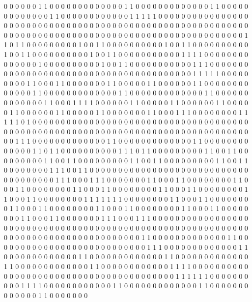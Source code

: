 0 0 0 0 0 0 1 1 0 0 0 0 0 0 0
0 0 0 0 0 0 1 1 0 0 0 0 0 0 0
0 0 0 0 0 0 1 1 0 0 0 0 0 0 0
0 0 0 0 0 0 1 1 0 0 0 0 0 0 0
0 0 0 0 0 1 1 1 1 1 0 0 0 0 0
0 0 0 0 0 0 0 0 0 0 0 0 0 0 0
0 0 0 0 0 0 0 0 0 0 0 0 0 0 0
0 0 0 0 0 0 0 0 0 0 0 0 0 0 0
0 0 0 0 0 0 0 0 0 0 0 0 0 0 0
0 0 0 0 0 0 0 0 0 0 0 0 0 0 0
0 0 0 0 0 0 0 0 0 0 0 0 0 0 0
0 0 0 0 0 0 1 1 0 1 1 0 0 0 0
0 0 0 0 0 1 0 0 1 1 0 0 0 0 0
0 0 0 0 0 1 0 0 1 1 0 0 0 0 0
0 0 0 0 0 1 0 0 1 1 0 0 0 0 0
0 0 0 0 0 1 0 0 1 1 0 0 0 0 0
0 0 0 0 0 0 1 1 1 1 0 0 0 0 0
0 0 0 0 0 0 0 0 0 1 0 0 0 0 0
0 0 0 0 0 1 0 0 1 1 0 0 0 0 0
0 0 0 0 0 0 1 1 1 0 0 0 0 0 0
0 0 0 0 0 0 0 0 0 0 0 0 0 0 0
0 0 0 0 0 0 0 0 0 0 0 0 0 0 0
0 0 0 0 1 1 1 1 1 0 0 0 0 0 0
0 0 0 1 1 0 0 0 1 1 0 0 0 0 0
0 0 1 1 0 0 0 0 0 1 1 0 0 0 0
0 0 1 1 0 0 0 0 0 0 0 0 0 0 0
0 0 1 1 0 0 0 0 0 0 0 0 0 0 0
0 0 1 1 0 0 0 0 0 0 0 0 0 0 0
0 0 1 1 0 0 0 0 0 0 0 0 0 0 0
0 0 1 1 0 0 0 1 1 1 1 0 0 0 0
0 0 1 1 0 0 0 0 0 1 1 0 0 0 0
0 0 1 1 0 0 0 0 0 1 1 0 0 0 0
0 0 1 1 0 0 0 0 0 1 1 0 0 0 0
0 0 0 1 1 0 0 0 1 1 1 0 0 0 0
0 0 0 0 1 1 1 1 1 0 1 0 0 0 0
0 0 0 0 0 0 0 0 0 0 0 0 0 0 0
0 0 0 0 0 0 0 0 0 0 0 0 0 0 0
0 0 0 0 0 0 0 0 0 0 0 0 0 0 0
0 0 0 0 0 0 0 0 0 0 0 0 0 0 0
0 0 0 0 0 0 0 0 0 0 0 0 0 0 0
0 0 0 0 1 1 1 0 0 0 0 0 0 0 0
0 0 0 0 0 1 1 0 0 0 0 0 0 0 0
0 0 0 0 0 1 1 0 0 0 0 0 0 0 0
0 0 0 0 0 1 1 0 1 1 0 0 0 0 0
0 0 0 0 0 1 1 1 0 1 1 0 0 0 0
0 0 0 0 0 1 1 0 0 1 1 0 0 0 0
0 0 0 0 0 1 1 0 0 1 1 0 0 0 0
0 0 0 0 0 1 1 0 0 1 1 0 0 0 0
0 0 0 0 0 1 1 0 0 1 1 0 0 0 0
0 0 0 0 1 1 1 0 0 1 1 0 0 0 0
0 0 0 0 0 0 0 0 0 0 0 0 0 0 0
0 0 0 0 0 0 0 0 0 0 0 0 0 0 0
0 0 0 1 1 1 0 0 0 1 1 1 0 0 0
0 0 0 0 1 1 0 0 0 1 1 0 0 0 0
0 0 0 0 1 1 0 0 0 1 1 0 0 0 0
0 0 0 0 1 1 0 0 0 1 1 0 0 0 0
0 0 0 0 1 1 0 0 0 1 1 0 0 0 0
0 0 0 0 1 1 0 0 0 1 1 0 0 0 0
0 0 0 0 1 1 1 1 1 1 1 0 0 0 0
0 0 0 0 1 1 0 0 0 1 1 0 0 0 0
0 0 0 0 1 1 0 0 0 1 1 0 0 0 0
0 0 0 0 1 1 0 0 0 1 1 0 0 0 0
0 0 0 0 1 1 0 0 0 1 1 0 0 0 0
0 0 0 0 1 1 0 0 0 1 1 0 0 0 0
0 0 0 1 1 1 0 0 0 1 1 1 0 0 0
0 0 0 0 0 0 0 0 0 0 0 0 0 0 0
0 0 0 0 0 0 0 0 0 0 0 0 0 0 0
0 0 0 0 0 0 0 0 0 0 0 0 0 0 0
0 0 0 0 0 0 0 0 0 0 0 0 0 0 0
0 0 0 0 0 0 0 0 0 0 0 0 0 0 0
0 0 0 0 0 0 1 1 0 0 0 0 0 0 0
0 0 0 0 0 0 1 1 0 0 0 0 0 0 0
0 0 0 0 0 0 0 0 0 0 0 0 0 0 0
0 0 0 0 0 1 1 1 0 0 0 0 0 0 0
0 0 0 0 0 0 1 1 0 0 0 0 0 0 0
0 0 0 0 0 0 1 1 0 0 0 0 0 0 0
0 0 0 0 0 0 1 1 0 0 0 0 0 0 0
0 0 0 0 0 0 1 1 0 0 0 0 0 0 0
0 0 0 0 0 0 1 1 0 0 0 0 0 0 0
0 0 0 0 0 1 1 1 1 0 0 0 0 0 0
0 0 0 0 0 0 0 0 0 0 0 0 0 0 0
0 0 0 0 0 0 0 0 0 0 0 0 0 0 0
0 0 0 0 1 1 1 1 1 1 0 0 0 0 0
0 0 0 0 0 1 1 1 1 0 0 0 0 0 0
0 0 0 0 0 0 1 1 0 0 0 0 0 0 0
0 0 0 0 0 0 1 1 0 0 0 0 0 0 0
0 0 0 0 0 0 1 1 0 0 0 0 0 0 0
